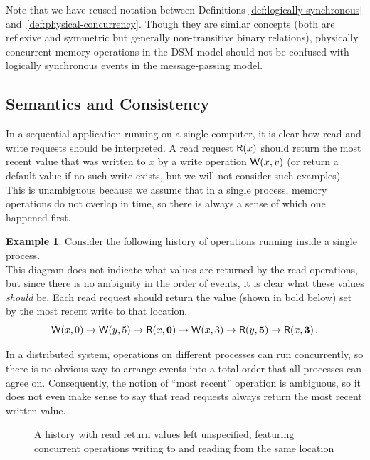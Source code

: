 \documentclass[]             %
{NASA}                       %
\theoremstyle{definition}
\newtheorem{example}[theorem]{Example}
\begin{document}
Note that we have reused notation between Definitions
\ref{def:logically-synchronous} and~\ref{def:physical-concurrency}.
Though they are similar concepts (both are reflexive and symmetric but
generally non-transitive binary relations), physically concurrent
memory operations in the DSM model should not be confused with
logically synchronous events in the message-passing model.

\subsection{Semantics and Consistency}
In a sequential application running on a single computer, it is clear
how read and write requests should be interpreted. A read request
$\mathsf{R}\!\left(x\right)$ should return the most recent value that was written to
$x$ by a write operation $\mathsf{W}\!\left(x, v\right)$ (or return a default value
if no such write exists, but we will not consider such examples). This
is unambiguous because we assume that in a single process, memory
operations do not overlap in time, so there is always a sense of which
one happened first.

\begin{example}
  Consider the following history of operations running inside a single process.
  \[\]
  This diagram does not indicate what values are returned by the read
  operations, but since there is no ambiguity in the order of events,
  it is clear what these values \emph{should} be. Each read request
  should return the value (shown in bold below) set by the most recent
  write to that location.
  \[ \mathsf{W}\!\left(x, 0\right) \to \mathsf{W}\!\left(y, 5\right) \to \mathsf{R}\!\left(x, \textbf{0}\right) \to \mathsf{W}\!\left(x, 3\right) \to \mathsf{R}\!\left(y, \textbf{5}\right) \to \mathsf{R}\!\left(x, \textbf{3}\right). \]
\end{example}

In a distributed system, operations on different processes can run
concurrently, so there is no obvious way to arrange events into a
total order that all processes can agree on. Consequently, the notion
of ``most recent'' operation is ambiguous, so it does not even make
sense to say that read requests always return the most recent written
value.

\begin{figure}[h]
  
  \caption{A history with read return values left unspecified,
    featuring concurrent operations writing to and reading from the
    same location}
  \label{fig:dsm-example-2}
\end{figure}
\end{document}
